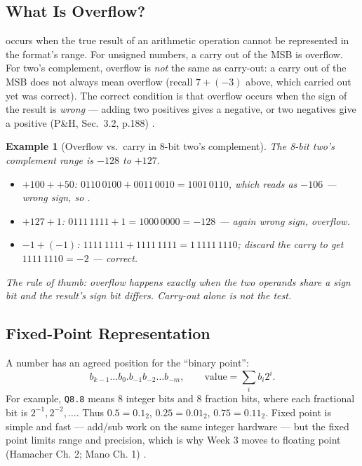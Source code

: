 \documentclass[11pt]{article}
\newtheorem{example}{Example}[section]
\begin{document}
\subsection{What Is Overflow?}

 occurs when the true result of an arithmetic operation cannot be represented in the format's range. For unsigned numbers, a carry out of the MSB is overflow. For two's complement, overflow is \emph{not} the same as carry-out: a carry out of the MSB does not always mean overflow (recall $7+(-3)$ above, which carried out yet was correct). The correct condition is that overflow occurs when the sign of the result is \emph{wrong} --- adding two positives gives a negative, or two negatives give a positive (P\&H, Sec.~3.2, p.188) \cite{PattersonHennessy2017_computer_organization_design}.

\begin{example}[Overflow vs.\ carry in 8-bit two's complement]
The 8-bit two's complement range is $-128$ to $+127$.
\begin{itemize}
  \item $+100 + +50$: $0110\,0100 + 0011\,0010 = 1001\,0110$, which reads as $-106$ --- wrong sign, so .
  \item $+127 + 1$: $0111\,1111 + 1 = 1000\,0000 = -128$ --- again wrong sign, overflow.
  \item $-1 + (-1)$: $1111\,1111 + 1111\,1111 = 1\,1111\,1110$; discard the carry to get $1111\,1110 = -2$ --- correct.
\end{itemize}
The rule of thumb: overflow happens exactly when the two operands share a sign bit and the result's sign bit differs. Carry-out alone is not the test.
\end{example}

\subsection{Fixed-Point Representation}

A  number has an agreed position for the ``binary point'':
\[
  b_{k-1}\dots b_0 . b_{-1} b_{-2} \dots b_{-m}, \qquad \text{value} = \sum_i b_i 2^i.
\]
For example, \texttt{Q8.8} means 8 integer bits and 8 fraction bits, where each fractional bit is $2^{-1}, 2^{-2}, \dots$. Thus $0.5 = 0.1_2$, $0.25 = 0.01_2$, $0.75 = 0.11_2$. Fixed point is simple and fast --- add/sub work on the same integer hardware --- but the fixed point limits range and precision, which is why Week 3 moves to floating point (Hamacher Ch. 2; Mano Ch. 1) \cite{Hamacher2002_computer_organization,Mano1993_computer_system_architecture}.
\end{document}
